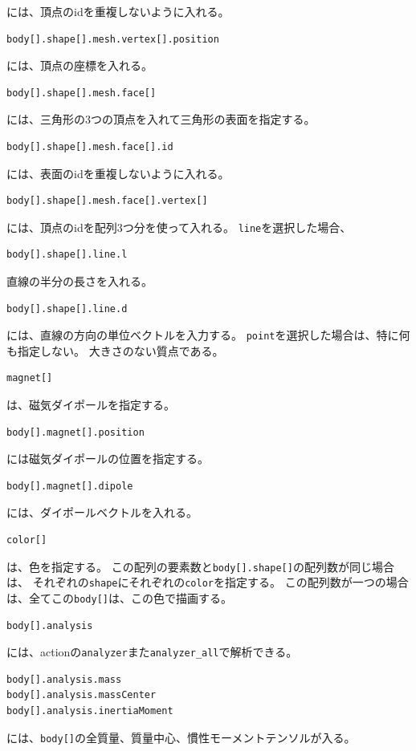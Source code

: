 \documentclass[a4paper,11pt]{jbook}
\begin{document}
には、頂点のidを重複しないように入れる。
\begin{verbatim}
body[].shape[].mesh.vertex[].position
\end{verbatim}
には、頂点の座標を入れる。
\begin{verbatim}
body[].shape[].mesh.face[]
\end{verbatim}
には、三角形の3つの頂点を入れて三角形の表面を指定する。
\begin{verbatim}
body[].shape[].mesh.face[].id
\end{verbatim}
には、表面のidを重複しないように入れる。
\begin{verbatim}
body[].shape[].mesh.face[].vertex[]
\end{verbatim}
には、頂点のidを配列3つ分を使って入れる。\newline
\verb|line|を選択した場合、
\begin{verbatim}
body[].shape[].line.l
\end{verbatim}
直線の半分の長さを入れる。
\begin{verbatim}
body[].shape[].line.d
\end{verbatim}
には、直線の方向の単位ベクトルを入力する。
\verb|point|を選択した場合は、特に何も指定しない。
大きさのない質点である。

\begin{verbatim}
magnet[]
\end{verbatim}
は、磁気ダイポールを指定する。
\begin{verbatim}
body[].magnet[].position
\end{verbatim}
には磁気ダイポールの位置を指定する。
\begin{verbatim}
body[].magnet[].dipole
\end{verbatim}
には、ダイポールベクトルを入れる。

\begin{verbatim}
color[]
\end{verbatim}
は、色を指定する。
この配列の要素数と\verb|body[].shape[]|の配列数が同じ場合は、
それぞれの\verb|shape|にそれぞれの\verb|color|を指定する。
この配列数が一つの場合は、全てこの\verb|body[]|は、この色で描画する。

\begin{verbatim}
body[].analysis
\end{verbatim}
には、actionの\verb|analyzer|また\verb|analyzer_all|で解析できる。
\begin{verbatim}
body[].analysis.mass
body[].analysis.massCenter
body[].analysis.inertiaMoment
\end{verbatim}
には、\verb|body[]|の全質量、質量中心、慣性モーメントテンソルが入る。
\end{document}
